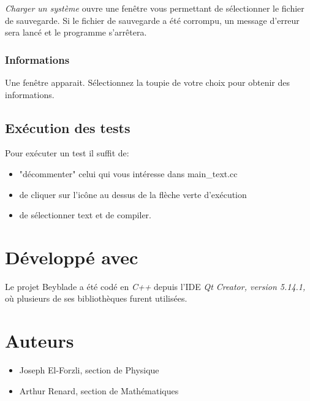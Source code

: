 \documentclass[a4paper]{article}%
\begin{document}
			\emph {Charger un système} ouvre une fenêtre vous permettant de sélectionner le fichier de sauvegarde. Si le fichier de sauvegarde a été corrompu, un message d'erreur sera lancé et le programme s'arrêtera.
		\subsubsection {Informations}
			Une fenêtre apparait. Sélectionnez la toupie de votre choix pour obtenir des informations.
	\subsection {Exécution des tests}
	Pour exécuter un test il suffit de:
		\begin {itemize}
			\item "décommenter" celui qui vous intéresse dans main\_text.cc
			\item de cliquer sur l'icône au dessus de la flèche verte d'exécution
			\item de sélectionner text et de compiler.
		\end {itemize}
\section{Développé avec}
	Le projet Beyblade a été codé en \emph{C++}  depuis l'IDE \emph{Qt Creator, version 5.14.1,} où plusieurs de ses bibliothèques furent utilisées.
	
\section {Auteurs}
	\begin{itemize}
		\item Joseph El-Forzli, section de Physique
		\item Arthur Renard, section de Mathématiques
	\end{itemize}
\end{document}
